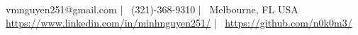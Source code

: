 \documentclass[]{awesome-cv}
\begin{document}
\begin{center}
	  \\
	\vspace{2mm}
	{\faEnvelope\ vmnguyen251@gmail.com} | {\faMobile\ (321)-368-9310} | {\faMapMarker\ Melbourne, FL USA} \\
	{\faLink\ \href{https://www.linkedin.com/in/minhnguyen251/}{https://www.linkedin.com/in/minhnguyen251/}} | {\faLink\ \href{https://github.com/n0k0m3/}{https://github.com/n0k0m3/}}
\end{center}
% 




% 
\
\end{document}
